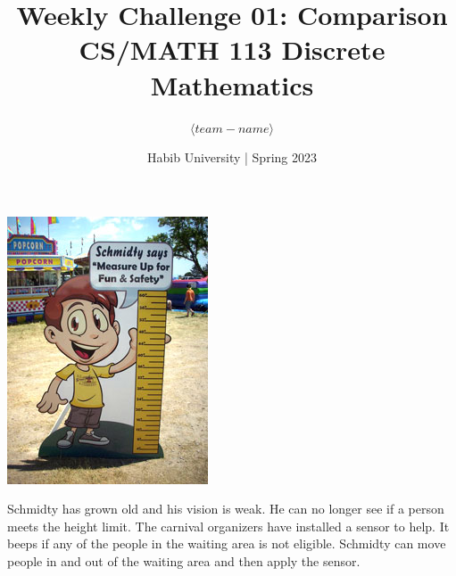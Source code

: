 \documentclass[a4paper]{exam}
\title{Weekly Challenge 01: Comparison\\CS/MATH 113 Discrete Mathematics}
\author{$\langle team-name \rangle$}  %
\date{Habib University | Spring 2023}
\begin{document}
\maketitle

\begin{questions}
  
  \begin{minipage}{.3\linewidth}
  \centerline{\includegraphics[width=\textwidth]{height}}
\end{minipage}
  \begin{minipage}{.65\linewidth}
Schmidty \cite{schmidt} has grown old and his vision is weak. He can no longer see if a person meets the height limit. The carnival organizers have installed a sensor to help. It beeps if any of the people in the waiting area is not eligible. Schmidty can move people in and out of the waiting area and then apply the sensor.

  \begin{parts}

\end{parts}
\end{minipage}
\end{questions}
\end{document}
